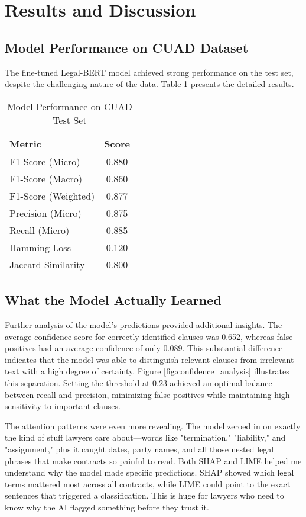 \section{Results and Discussion}

\subsection{Model Performance on CUAD Dataset}

The fine-tuned Legal-BERT model achieved strong performance on the test set, despite the challenging nature of the data. Table \ref{tab:model_performance} presents the detailed results.

\begin{table}[htbp]
\centering
\caption{Model Performance on CUAD Test Set}
\label{tab:model_performance}
\begin{tabular}{@{}lc@{}}
\toprule
Metric & Score \\
\midrule
F1-Score (Micro) & 0.880 \\
F1-Score (Macro) & 0.860 \\
F1-Score (Weighted) & 0.877 \\
Precision (Micro) & 0.875 \\
Recall (Micro) & 0.885 \\
Hamming Loss & 0.120 \\
Jaccard Similarity & 0.800 \\
\bottomrule
\end{tabular}
\end{table}

\subsection{What the Model Actually Learned}

Further analysis of the model's predictions provided additional insights. The average confidence score for correctly identified clauses was 0.652, whereas false positives had an average confidence of only 0.089. This substantial difference indicates that the model was able to distinguish relevant clauses from irrelevant text with a high degree of certainty. Figure \ref{fig:confidence_analysis} illustrates this separation. Setting the threshold at 0.23 achieved an optimal balance between recall and precision, minimizing false positives while maintaining high sensitivity to important clauses.

The attention patterns were even more revealing. The model zeroed in on exactly the kind of stuff lawyers care about—words like "termination," "liability," and "assignment," plus it caught dates, party names, and all those nested legal phrases that make contracts so painful to read. Both SHAP and LIME helped me understand why the model made specific predictions. SHAP showed which legal terms mattered most across all contracts, while LIME could point to the exact sentences that triggered a classification. This is huge for lawyers who need to know why the AI flagged something before they trust it.

